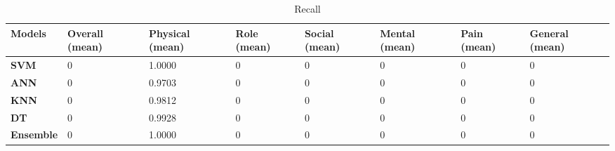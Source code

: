 \documentclass[runningheads]{llncs}
\begin{document}
%
%
%
%
%
\begin{table}[h]
\begin{tabular}{|C{2cm}|C{1.5cm}|C{1.5cm}|C{1.5cm}|C{1.5cm}|C{1.5cm}|C{1.5cm}|C{1.5cm}|}
\hline
{} 
{\color[HTML]{333333} \textbf{Models}} & {\color[HTML]{333333} \textbf{Overall (mean)}} & {\color[HTML]{333333} \textbf{Physical (mean)}} & {\color[HTML]{333333} \textbf{Role (mean)}} &{\color[HTML]{333333} \textbf{Social (mean)}} & {\color[HTML]{333333} \textbf{Mental (mean)}} & {\color[HTML]{333333} \textbf{Pain (mean)}} & {\color[HTML]{333333} \textbf{General (mean)}} \\ \hline
{} 
\textbf{SVM}                           & 0                                       & 1.0000                                        & 0                                                          & 0                                                            & 0                                                            & 0                                                          & 0                                      \\ \hline
{} 
\textbf{ANN}                           & 0                                       & 0.9703                                        & 0                                                          & 0                                                            & 0                                                            & 0                                                          & 0                                      \\ \hline
{} 
\textbf{KNN}                           & 0                                       & 0.9812                                      & 0                                                          & 0                                                            & 0                                                            & 0                                                          & 0                                      \\ \hline
{} 
\textbf{DT}                            & 0                                       & 0.9928                                        & 0                                                          & 0                                                            & 0                                                            & 0                                                          & 0                                      \\ \hline
{} 
\textbf{Ensemble}                      & 0                                       & 1.0000                                        & 0                                                          & 0                                                            & 0                                                            & 0                                                          & 0                                      \\ \hline
\end{tabular}
\caption{Recall}
\label{Recall}
\end{table}
%
%
%
%
%
%
%
%
%
%
%
\end{document}
